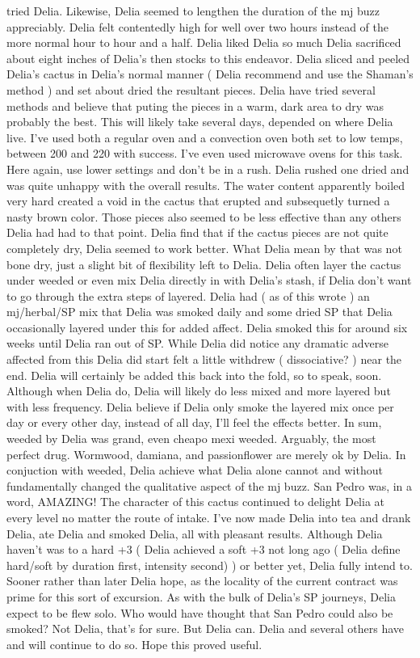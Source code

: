 \documentclass[12pt]{book}
\begin{document}
tried Delia. Likewise, Delia seemed to lengthen the duration of the mj buzz appreciably. Delia felt contentedly high for well over two hours instead of the more normal hour to hour and a half. Delia liked Delia so much Delia sacrificed about eight inches of Delia's then stocks to this endeavor. Delia sliced and peeled Delia's cactus in Delia's normal manner ( Delia recommend and use the Shaman's method ) and set about dried the resultant pieces. Delia have tried several methods and believe that puting the pieces in a warm, dark area to dry was probably the best. This will likely take several days, depended on where Delia live. I've used both a regular oven and a convection oven both set to low temps, between 200 and 220 with success. I've even used microwave ovens for this task. Here again, use lower settings and don't be in a rush. Delia rushed one dried and was quite unhappy with the overall results. The water content apparently boiled very hard created a void in the cactus that erupted and subsequetly turned a nasty brown color. Those pieces also seemed to be less effective than any others Delia had had to that point. Delia find that if the cactus pieces are not quite completely dry, Delia seemed to work better. What Delia mean by that was not bone dry, just a slight bit of flexibility left to Delia. Delia often layer the cactus under weeded or even mix Delia directly in with Delia's stash, if Delia don't want to go through the extra steps of layered. Delia had ( as of this wrote ) an mj/herbal/SP mix that Delia was smoked daily and some dried SP that Delia occasionally layered under this for added affect. Delia smoked this for around six weeks until Delia ran out of SP. While Delia did notice any dramatic adverse affected from this Delia did start felt a little withdrew ( dissociative? ) near the end. Delia will certainly be added this back into the fold, so to speak, soon. Although when Delia do, Delia will likely do less mixed and more layered but with less frequency. Delia believe if Delia only smoke the layered mix once per day or every other day, instead of all day, I'll feel the effects better. In sum, weeded by Delia was grand, even cheapo mexi weeded. Arguably, the most perfect drug. Wormwood, damiana, and passionflower are merely ok by Delia. In conjuction with weeded, Delia achieve what Delia alone cannot and without fundamentally changed the qualitative aspect of the mj buzz. San Pedro was, in a word, AMAZING! The character of this cactus continued to delight Delia at every level no matter the route of intake. I've now made Delia into tea and drank Delia, ate Delia and smoked Delia, all with pleasant results. Although Delia haven't was to a hard +3 ( Delia achieved a soft +3 not long ago ( Delia define hard/soft by duration first, intensity second) ) or better yet, Delia fully intend to. Sooner rather than later Delia hope, as the locality of the current contract was prime for this sort of excursion. As with the bulk of Delia's SP journeys, Delia expect to be flew solo. Who would have thought that San Pedro could also be smoked? Not Delia, that's for sure. But Delia can. Delia and several others have and will continue to do so. Hope this proved useful.
\end{document}
